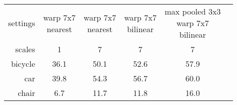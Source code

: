\begin{tabular}{@{}rccccl@{}}
\toprule
settings      & \mcell{warp 7x7\\nearest}  & \mcell{warp 7x7\\nearest}  & \mcell{warp 7x7\\bilinear}  & \mcell{max pooled 3x3\\warp 7x7\\bilinear} \\
scales        & 1                          & 7                           & 7                          & 7 \\
\midrule
bicycle       & 36.1                       & 50.1                        & 52.6                       & 57.9 \\
car           & 39.8                       & 54.3                        & 56.7                       & 60.0 \\
chair         & 6.7                        & 11.7                        & 11.8                       & 16.0 \\

\end{tabular}
